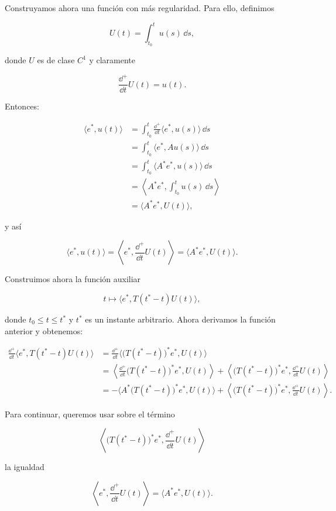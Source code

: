 Construyamos ahora una función con más regularidad. Para ello, definimos

\[U(t) = \int_{t_0}^t u(s) \, \dd s,\]

donde $U$ es de clase $C^1$ y claramente

\[\frac{\dd^+}{\dd t}U(t) = u(t).\]

Entonces:

\begin{align*}
    \langle e^*, u(t) \rangle &= \int_{t_0}^t \frac{\dd^+}{\dd t}\langle e^*, u(s)\rangle \, \dd s\\
    &= \int_{t_0}^t \langle e^*, Au(s)\rangle \, \dd s\\
    &= \int_{t_0}^t \langle A^*e^*, u(s)\rangle \, \dd s\\
    &= \left \langle A^*e^*, \int_{t_0}^t u(s) \, \dd s\right \rangle\\
    &= \langle A^*e^*, U(t) \rangle,
\end{align*}

y así

\[\langle e^*, u(t) \rangle = \left \langle e^*, \frac{\dd^+}{\dd t}U(t)\right \rangle = \langle A^*e^*, U(t) \rangle.\]

Construimos ahora la función auxiliar

\[t \mapsto \langle e^*, T(t^* - t)U(t) \rangle,\]

donde $t_0 \leq t \leq t^*$ y $t^*$ es un instante arbitrario. Ahora derivamos la función anterior y obtenemos:

\begin{align*}
    \frac{\dd^+}{\dd t}\langle e^*, T(t^* - t)U(t) \rangle &= \frac{\dd^+}{\dd t}\Big \langle \big (T(t^* - t)\big)^*e^*, U(t) \Big\rangle\\
    &= \left \langle \frac{\dd^+}{\dd t} \big (T(t^* - t)\big)^*e^*, U(t) \right\rangle + \left\langle \big (T(t^* - t)\big)^*e^*, \frac{\dd^+}{\dd t}U(t) \right\rangle\\
    &= -\Big\langle A^*\big (T(t^* - t)\big)^*e^*, U(t) \Big\rangle + \left\langle \big (T(t^* - t)\big)^*e^*, \frac{\dd^+}{\dd t}U(t) \right\rangle.
\end{align*}

Para continuar, queremos usar sobre el término

\[\left\langle \big (T(t^* - t)\big)^*e^*, \frac{\dd^+}{\dd t}U(t) \right\rangle\]

la igualdad

\[\left \langle e^*, \frac{\dd^+}{\dd t}U(t)\right \rangle = \langle A^*e^*, U(t) \rangle.\]

